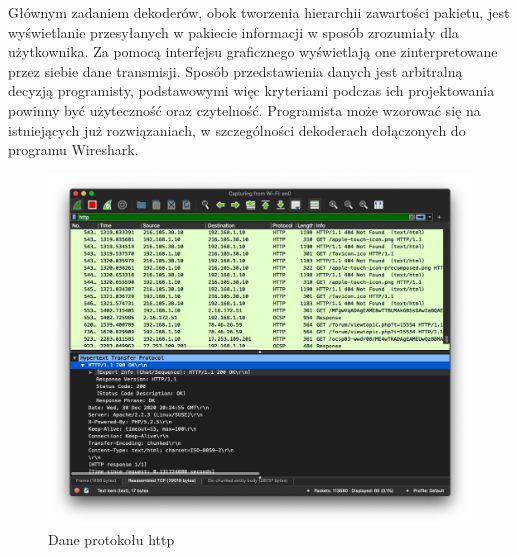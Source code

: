 \documentclass[a4paper, 12pt, twoside, openright]{article}
\begin{document}
	Głównym zadaniem dekoderów, obok tworzenia hierarchii zawartości pakietu, jest wyświetlanie przesyłanych w pakiecie informacji w sposób zrozumiały dla użytkownika.
	Za pomocą interfejsu graficznego wyświetlają one zinterpretowane przez siebie dane transmisji. Sposób przedstawienia danych
	jest arbitralną decyzją programisty, podstawowymi więc kryteriami podczas ich projektowania powinny być użyteczność oraz czytelność.
	Programista może wzorować się na istniejących już rozwiązaniach, w szczególności dekoderach dołączonych do programu Wireshark.

	\begin{figure}[h]
		\centering
			\includegraphics[width=1.0\textwidth]{img/screenshot_fis_http.png}
		\caption{Dane protokołu http}
		\label{fig:fis_http}
	\end{figure}


	\newpage
\end{document}

